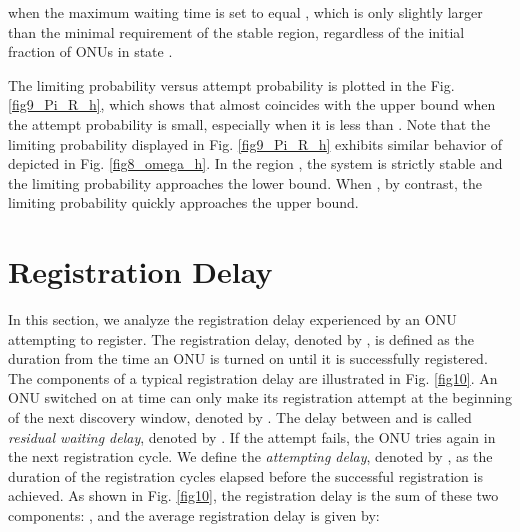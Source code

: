 \documentclass[journal]{IEEEtran}
\begin{document}
when the maximum waiting time is set to equal , which is only slightly larger than the minimal requirement  of the stable region, regardless of the initial fraction of ONUs in state .

The limiting probability  versus attempt probability  is plotted in the Fig. \ref{fig9_Pi_R_h}, which shows that  almost coincides with the upper bound  when the attempt probability  is small, especially when it is less than . Note that the limiting probability  displayed in Fig. \ref{fig9_Pi_R_h} exhibits similar behavior of  depicted in Fig. \ref{fig8_omega_h}. In the region , the system is strictly stable and the limiting probability  approaches the lower bound. When , by contrast, the limiting probability  quickly approaches the upper bound.

\section{Registration Delay}\label{section4}
In this section, we analyze the registration delay experienced by an ONU attempting to register. The registration delay, denoted by , is defined as the duration from the time an ONU is turned on until it is successfully registered. The components of a typical registration delay are illustrated in Fig. \ref{fig10}. An ONU switched on at time  can only make its registration attempt at the beginning of the next discovery window, denoted by . The delay between  and  is called \emph{residual waiting delay}, denoted by . If the attempt fails, the ONU tries again in the next registration cycle. We define the \emph{attempting delay}, denoted by , as the duration of the registration cycles elapsed before the successful registration is achieved. As shown in Fig. \ref{fig10}, the registration delay is the sum of these two components: , and the average registration delay is given by:
\end{document}
